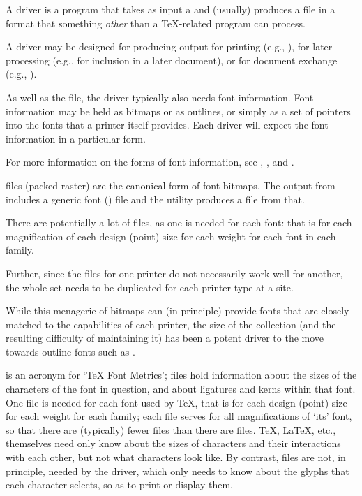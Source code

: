 
A  driver is a program that takes as input a
and (usually) produces a file in a format that something \emph{other}
than a \TeX{}-related program can process.

A driver may be designed for producing output for printing (e.g.,
\PS{}), for later processing (e.g., \PS{} for inclusion in a later
document), or for document exchange (e.g., ).

As well as the  file, the driver typically also needs font
information.  Font information may be held as bitmaps or as outlines,
or simply as a set of pointers into the fonts that a printer itself
provides.  Each driver will expect the font information in a particular
form.

For more information on the forms of font information, see
,
,
and .


 files (packed raster) are the canonical form of \tex{} font
bitmaps.  The output from  includes a generic
font () file and the utility  produces a
 file from that.

There are potentially a lot of  files, as one
is needed for each font: that is for each magnification of each
design (point) size for each weight for each font in each family.

Further, since the  files for one printer do not necessarily
work well for another, the whole set needs to be duplicated for each
printer type at a site.

While this menagerie of bitmaps can (in principle) provide fonts that
are closely matched to the capabilities of each printer, the size of
the collection (and the resulting difficulty of maintaining it) has
been a potent driver to the move towards outline fonts such as
.


 is an acronym for `\TeX{} Font Metrics';  files hold
information about the sizes of the characters of the font in question,
and about ligatures and kerns within that font.  One  file is
needed for each font used by \TeX{}, that is for each design (point)
size for each weight for each family; each  file serves for all
magnifications of `its' font, so that there are (typically) fewer
 files than there are  files.  \TeX{},
\LaTeX{}, etc.,\@
themselves need only know about the sizes of characters and their
interactions with each other, but not what characters look like.  By
contrast,  files are not, in principle, needed by the
 driver, which only needs to know about the glyphs that each
character selects, so as to print or display them.

